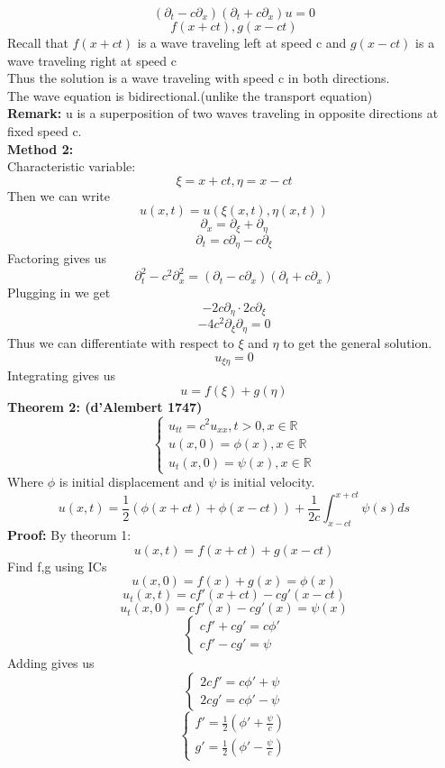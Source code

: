 \documentclass{article}
\begin{document}
$$(\partial_t - c \partial_x)(\partial_t + c \partial_x)u = 0 $$
$$ f(x+ct), g(x-ct)$$
Recall that $f(x+ct)$ is a wave traveling left at speed c and $g(x-ct)$ is a wave traveling right at speed c\\
Thus the solution is a wave traveling with speed c in both directions.\\
The wave equation is bidirectional.(unlike the transport equation)\\
\textbf{Remark:} u is a superposition of two waves traveling in opposite directions at fixed speed c.\\
\textbf{Method 2:} \\
Characteristic variable: 
$$ \xi = x + ct, \eta = x - ct $$
Then we can write 
$$ u(x,t) = u(\xi(x,t),\eta(x,t)) $$
$$ \partial_x = \partial_\xi + \partial_\eta $$
$$ \partial_t = c \partial_\eta - c \partial_\xi $$
Factoring gives us 
$$ \partial_t^2 - c^2 \partial_x^2 = (\partial_t -c\partial_x)(\partial_t + c \partial_x) $$
Plugging in we get 
$$ -2c\partial_\eta \cdot 2c \partial_\xi  $$
$$ -4c^2 \partial_\xi \partial_\eta = 0 $$ 
Thus we can differentiate with respect to $\xi$ and $\eta$ to get the general solution.
$$ u_{\xi \eta} = 0 $$
Integrating gives us
$$ u = f(\xi) + g(\eta) $$
\textbf{Theorem 2: (d'Alembert 1747)}
$$\begin{cases}
    u_{tt} = c^2 u_{xx}, t>0, x \in \mathds{R}\\
    u(x,0) = \phi(x), x \in \mathds{R}\\
    u_t(x,0) = \psi(x), x \in \mathds{R}
\end{cases} 
$$
Where $\phi$ is initial displacement and $\psi$ is initial velocity.\\
$$ u(x,t) = \frac{1}{2} \left( \phi(x + ct) + \phi(x - ct) \right) + \frac{1}{2c} \int_{x - ct}^{x + ct} \psi(s) ds $$
\textbf{Proof:} By theorum 1: 
$$ u(x,t) = f(x+ct) + g(x-ct)$$
Find f,g using ICs 
$$ u(x,0) = f(x) + g(x) = \phi(x) $$
$$ u_t(x,t) = cf'(x+ct) - cg'(x-ct) $$
$$ u_t(x,0) = c f'(x) - c g'(x) = \psi(x) $$
$$\begin{cases}
    c f' + cg' = c \phi'\\
    c f' - cg' = \psi
\end{cases}
$$
Adding gives us
$$\begin{cases}
    2cf' = c \phi' + \psi\\
    2cg' = c \phi' - \psi
\end{cases}
$$
$$
\begin{cases}
    f' = \frac{1}{2} \left( \phi' + \frac{\psi}{c} \right)\\
    g' = \frac{1}{2} \left( \phi' - \frac{\psi}{c} \right)
\end{cases}
$$
\end{document}
